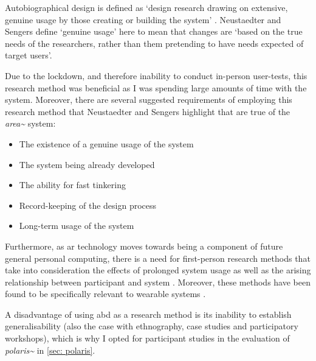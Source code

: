 Autobiographical design is defined as `design research drawing on extensive, genuine usage by those creating or building the system' \citep{neustaedter2012}. Neustaedter and Sengers define `genuine usage' here to mean that changes are `based on the true needs of the researchers, rather than them pretending to have needs expected of target users'.

Due to the lockdown, and therefore inability to conduct in-person user-tests, this research method was beneficial as I was spending large amounts of time with the system. Moreover, there are several suggested requirements of employing this research method that Neustaedter and Sengers highlight that are true of the \textit{area\textasciitilde{}} system:
\begin{itemize}
    \item The existence of a genuine usage of the system
    \item The system being already developed
    \item The ability for fast tinkering 
    \item Record-keeping of the design process
    \item Long-term usage of the system
\end{itemize}
Furthermore, as \gls{ar} technology moves towards being a component of future general personal computing, there is a need for first-person research methods that take into consideration the effects of prolonged system usage as well as the arising relationship between participant and system \citep{desjardins2018}. Moreover, these methods have been found to be specifically relevant to wearable systems \citep{cecchinato2017}.

A disadvantage of using \gls{abd} as a research method is its inability to establish generalisability (also the case with ethnography, case studies and participatory workshops), which is why I opted for participant studies in the evaluation of \textit{polaris\textasciitilde{}} in \autoref{sec: polaris}.

